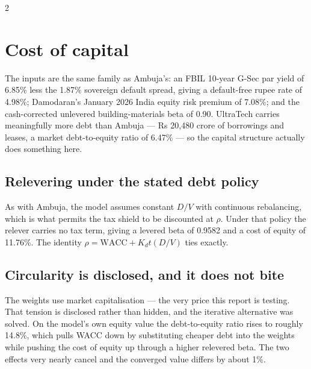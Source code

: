 \begin{paracol}{2}


\switchcolumn*
\section{Cost of capital}

The inputs are the same family as Ambuja's: an FBIL 10-year G-Sec par yield of 6.85\%
less the 1.87\% sovereign default spread, giving a default-free rupee rate of 4.98\%;
Damodaran's January 2026 India equity risk premium of 7.08\%; and the cash-corrected
unlevered building-materials beta of 0.90. UltraTech carries meaningfully more debt
than Ambuja — Rs 20,480 crore of borrowings and leases, a market debt-to-equity ratio
of 6.47\% — so the capital structure actually does something here.

\subsection{Relevering under the stated debt policy}

As with Ambuja, the model assumes constant $D/V$ with continuous rebalancing, which
is what permits the tax shield to be discounted at $\rho$. Under that policy the
relever carries no tax term, giving a levered beta of 0.9582 and a cost of equity of
11.76\%. The identity $\rho = \text{WACC} + K_d t (D/V)$ ties exactly.

\subsection{Circularity is disclosed, and it does not bite}

The weights use market capitalisation — the very price this report is testing. That
tension is disclosed rather than hidden, and the iterative alternative was solved. On
the model's own equity value the debt-to-equity ratio rises to roughly 14.8\%, which
pulls WACC down by substituting cheaper debt into the weights while pushing the cost
of equity up through a higher relevered beta. The two effects very nearly cancel and
the converged value differs by about 1\%.


\end{paracol}
